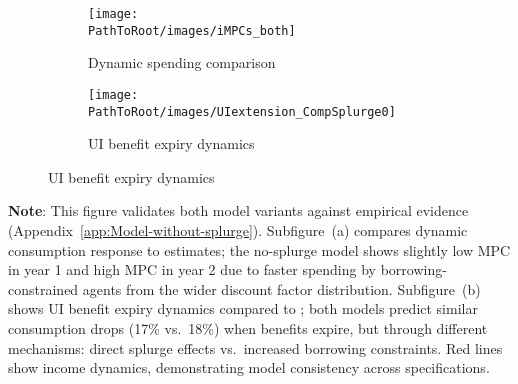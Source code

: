 \documentclass[\PathToRoot/\ProjectName]{subfiles}
\begin{document}
\begin{figure}[H]
  \centering
  \caption{Validation moments in models with and without splurge}
  \whenintegrated{\label{fig:untargetedMoments_wSplZero}} 
  \noindent\begin{minipage}{\textwidth}
    \centering
    \begin{subfigure}[b]{.48\linewidth}
      \centering
      \texttt{[image: \\PathToRoot/images/iMPCs\_both]}
      \caption{Dynamic spending comparison}
      \whenintegrated{\label{fig:USaggmpclotterywin_wSplZero}} 
    \end{subfigure}
    \begin{subfigure}[b]{.48\linewidth}
      \centering
      \texttt{[image: \\PathToRoot/images/UIextension\_CompSplurge0]}
      \caption{UI benefit expiry dynamics}
      \whenintegrated{\label{fig:expiryUI_wSplZero}} 
    \end{subfigure}
  \end{minipage}
\end{figure}
\noindent\parbox{\textwidth}{\footnotesize
  \textbf{Note}: This figure validates both model variants against empirical evidence (Appendix~\ref{app:Model-without-splurge}).
  Subfigure~(a) compares dynamic consumption response to \cite{fagereng-mpc-2021} estimates;
  the no-splurge model shows slightly low MPC in year 1 and high MPC in year 2 due to
  faster spending by borrowing-constrained agents from the wider discount factor distribution.
  Subfigure~(b) shows UI benefit expiry dynamics compared to \cite{ganongConsumer2019};
  both models predict similar consumption drops (17\% vs.\ 18\%) when benefits expire,
  but through different mechanisms: direct splurge effects vs.\ increased borrowing constraints.
  Red lines show income dynamics, demonstrating model consistency across specifications.
}

\vspace{2em}  %

\smartbib
\end{document}
